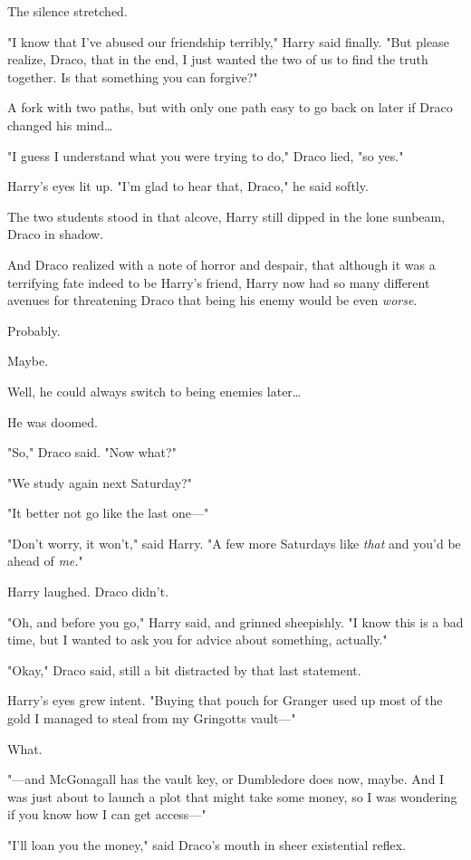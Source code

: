 The silence stretched.

"I know that I've abused our friendship terribly," Harry said finally. "But
please realize, Draco, that in the end, I just wanted the two of us to find the
truth together. Is that something you can forgive?"

A fork with two paths, but with only one path easy to go back on later if Draco
changed his mind{\ldots}

"I guess I understand what you were trying to do," Draco lied, "so yes."

Harry's eyes lit up. "I'm glad to hear that, Draco," he said softly.

The two students stood in that alcove, Harry still dipped in the lone sunbeam,
Draco in shadow.

And Draco realized with a note of horror and despair, that although it was a
terrifying fate indeed to be Harry's friend, Harry now had so many different
avenues for threatening Draco that being his enemy would be even \emph{worse}.

Probably.

Maybe.

Well, he could always switch to being enemies later{\ldots}

He was doomed.

"So," Draco said. "Now what?"

"We study again next Saturday?"

"It better not go like the last one---"

"Don't worry, it won't," said Harry. "A few more Saturdays like \emph{that} and
you'd be ahead of \emph{me.}"

Harry laughed. Draco didn't.

"Oh, and before you go," Harry said, and grinned sheepishly. "I know this is a
bad time, but I wanted to ask you for advice about something, actually."

"Okay," Draco said, still a bit distracted by that last statement.

Harry's eyes grew intent. "Buying that pouch for Granger used up most of the
gold I managed to steal from my Gringotts vault---"

What.

"---and McGonagall has the vault key, or Dumbledore does now, maybe. And I was
just about to launch a plot that might take some money, so I was wondering if
you know how I can get access---"

"I'll loan you the money," said Draco's mouth in sheer existential reflex.

